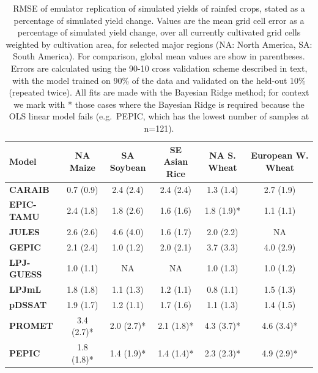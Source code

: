 \documentclass[gmdd]{copernicus} %
\begin{document}
\begin{table}[ht]
    \caption{
    RMSE of emulator replication of simulated yields of rainfed crops, stated as a percentage of simulated yield change.
    Values are the mean grid cell error as a percentage of simulated yield change, over all currently cultivated grid cells weighted by cultivation area, for selected major regions (NA: North America, SA: South America). For comparison, global mean values are show in parentheses. 
    Errors are calculated using the 90-10 cross validation scheme described in text, with the model trained on 90\% of the data and validated on the held-out 10\% (repeated twice). All fits are made with the Bayesian Ridge method; 
    for context we mark with * those cases where the Bayesian Ridge is required because the OLS linear model fails (e.g.\ PEPIC, which has the lowest number of samples at n=121).
    } 
    \label{table:ASE}
    \begin{tabular}{l | c | c | c | c | c} 
        \hline
        \textbf{Model} & \textbf{NA Maize} & \textbf{SA Soybean} & \textbf{SE Asian Rice} & \textbf{NA S. Wheat} &\textbf{European W. Wheat} \\ \hline
        \textbf{CARAIB}    & 0.7 (0.9)  & 2.4 (2.4)  & 2.4 (2.4)  & 1.3 (1.4)  & 2.7 (1.9)  \\ \hline
        \textbf{EPIC-TAMU} & 2.4 (1.8)  & 1.8 (2.6)  & 1.6 (1.6)  & 1.8 (1.9)* & 1.1 (1.1)  \\ \hline
        \textbf{JULES}     & 2.6 (2.6)  & 4.6 (4.0)  & 1.6 (1.7)  & 2.0 (2.2)  & NA         \\ \hline
        \textbf{GEPIC}     & 2.1 (2.4)  & 1.0 (1.2)  & 2.0 (2.1)  & 3.7 (3.3)  & 4.0 (2.9)  \\ \hline
        \textbf{LPJ-GUESS} & 1.0 (1.1)  & NA         & NA         & 1.0 (1.3)  & 1.0 (1.2)  \\ \hline
        \textbf{LPJmL}     & 1.8 (1.8)  & 1.1 (1.3)  & 1.2 (1.1)  & 0.8 (1.1)  & 1.5 (1.3)  \\ \hline
        \textbf{pDSSAT}    & 1.9 (1.7)  & 1.2 (1.1)  & 1.7 (1.6)  & 1.1 (1.3)  & 1.4 (1.5)  \\ \hline
        \textbf{PROMET}    & 3.4 (2.7)* & 2.0 (2.7)* & 2.1 (1.8)* & 4.3 (3.7)* & 4.6 (3.4)* \\ \hline
        \textbf{PEPIC}     & 1.8 (1.8)* & 1.4 (1.9)* & 1.4 (1.4)* & 2.3 (2.3)* & 4.9 (2.9)* \\ \hline
    \end{tabular}
\end{table}
\end{document}

